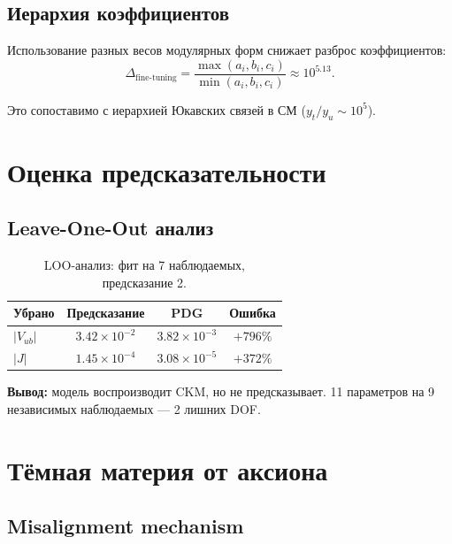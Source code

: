 \documentclass[12pt,a4paper]{article}
\numberwithin{equation}{section}
\begin{document}
\subsection{Иерархия коэффициентов}

Использование разных весов модулярных форм снижает разброс 
коэффициентов:
\begin{equation}
\Delta_{\text{fine-tuning}} = \frac{\max(a_i, b_i, c_i)}{\min(a_i, b_i, c_i)} 
\approx 10^{5.13}.
\end{equation}

Это сопоставимо с иерархией Юкавских связей в СМ 
($y_t/y_u \sim 10^5$).

\section{Оценка предсказательности}

\subsection{Leave-One-Out анализ}

\begin{table}[H]
\centering
\caption{LOO-анализ: фит на 7 наблюдаемых, предсказание 2.}
\begin{tabular}{lccc}
\toprule
Убрано & Предсказание & PDG & Ошибка \\
\midrule
$|V_{ub}|$ & $3.42 \times 10^{-2}$ & $3.82 \times 10^{-3}$ & $+796\%$ \\
$|J|$      & $1.45 \times 10^{-4}$ & $3.08 \times 10^{-5}$ & $+372\%$ \\
\bottomrule
\end{tabular}
\end{table}

\textbf{Вывод:} модель воспроизводит CKM, но не предсказывает. 
11 параметров на 9 независимых наблюдаемых --- 2 лишних DOF.

\section{Тёмная материя от аксиона}
\label{sec:dm}

\subsection{Misalignment mechanism}
\end{document}

